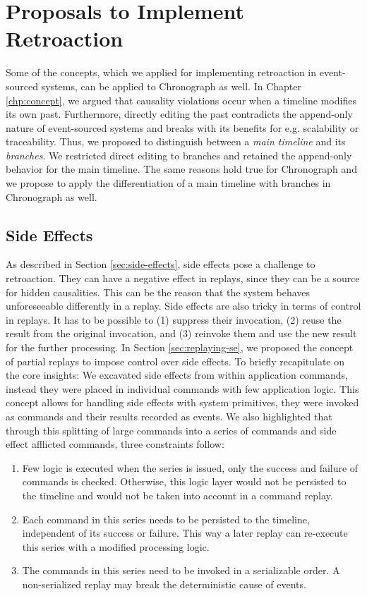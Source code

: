 \section{Proposals to Implement Retroaction}
Some of the concepts, which we applied for implementing retroaction in 
event-sourced systems, can be applied to Chronograph as well.
In Chapter \ref{chp:concept}, we argued that causality violations occur when 
a timeline modifies its own past. Furthermore, directly editing the past 
contradicts the append-only nature of event-sourced systems and breaks with 
its benefits for e.g. scalability or traceability.
Thus, we proposed to distinguish between a \emph{main timeline} and its 
\emph{branches}. We restricted direct editing to branches and retained the 
append-only behavior for the main timeline.
The same reasons hold true for Chronograph and we propose to apply the 
differentiation of a main timeline with branches in Chronograph as well. 

\pagebreak
\subsection{Side Effects}
As described in Section \ref{sec:side-effects}, side effects pose a challenge 
to retroaction. They can have a negative effect in replays, since they can be 
a source for hidden causalities. This can be the reason that the system behaves 
unforeseeable differently in a replay. 
Side effects are also tricky in terms of control in replays. It has to be 
possible to (1) suppress their invocation, (2) reuse the result from the 
original invocation, and (3) reinvoke them and use the new result for the 
further processing. In Section \ref{sec:replaying-se}, we proposed the concept 
of partial replays to impose control over side effects. 
To briefly recapitulate on the core insights: We excavated side effects from 
within application commands, instead they were placed in individual commands 
with few application logic. 
This concept allows for handling side effects with system primitives, they were 
invoked as commands and their results recorded as events.
We also highlighted that through this splitting of large commands into a series 
of commands and side effect afflicted commands, three constraints follow: 

\begin{enumerate}
\item Few logic is executed when the series is issued, only the success and
failure of commands is checked. Otherwise, this logic layer would not be 
persisted to the timeline and would not be taken into account in a command 
replay.

\item Each command in this series needs to be persisted to the timeline, 
independent of its success or failure. This way a later replay can re-execute 
this series with a modified processing logic.

\item The commands in this series need to be invoked in a serializable order.
A non-serialized replay may break the deterministic cause of events.
\end{enumerate}

